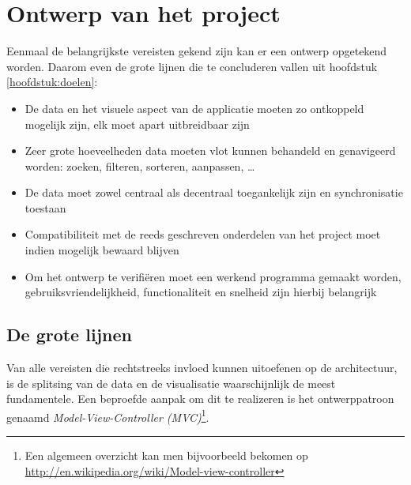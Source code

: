 \chapter{Ontwerp van het project}
\label{hoofdstuk:ontwerp}

Eenmaal de belangrijkste vereisten gekend zijn kan er een ontwerp opgetekend worden. Daarom even de grote lijnen die te concluderen vallen uit hoofdstuk \ref{hoofdstuk:doelen}:

\begin{itemize}
  \item De data en het visuele aspect van de applicatie moeten zo ontkoppeld mogelijk zijn, elk moet apart uitbreidbaar zijn
  \item Zeer grote hoeveelheden data moeten vlot kunnen behandeld en genavigeerd worden: zoeken, filteren, sorteren, aanpassen, \ldots
  \item De data moet zowel centraal als decentraal toegankelijk zijn en synchronisatie toestaan
  \item Compatibiliteit met de reeds geschreven onderdelen van het project moet indien mogelijk bewaard blijven
  \item Om het ontwerp te verifi\"eren moet een werkend programma gemaakt worden, gebruiksvriendelijkheid, functionaliteit en snelheid zijn hierbij belangrijk
\end{itemize}

\section{De grote lijnen}
Van alle vereisten die rechtstreeks invloed kunnen uitoefenen op de architectuur, is de splitsing van de data en de visualisatie waarschijnlijk de meest fundamentele. Een beproefde aanpak om dit te realizeren is het ontwerppatroon genaamd \emph{Model-View-Controller (MVC)}\footnote{Een algemeen overzicht kan men bijvoorbeeld bekomen op \url{http://en.wikipedia.org/wiki/Model-view-controller}}.\\

